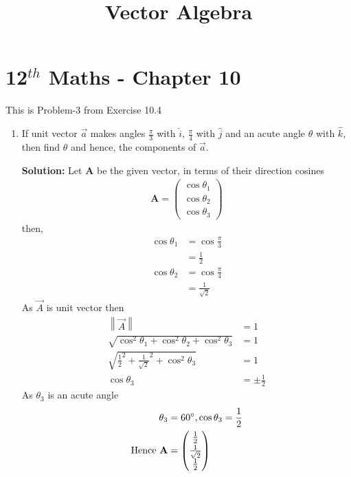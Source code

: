 \documentclass[12pt]{article}
\providecommand{\norm}[1]{\left\lVert#1\right\rVert}
\newcommand{\solution}{\noindent \textbf{Solution: }}
\newcommand{\myvec}[1]{\ensuremath{\begin{pmatrix}#1\end{pmatrix}}}
\let\vec\mathbf
\begin{document}
\begin{center}
\enlargethispage{-4cm}
\title{\textbf{Vector Algebra}}
\date{\vspace{-5ex}} %
\maketitle
\end{center}
\setcounter{page}{1}
\section*{12$^{th}$ Maths - Chapter 10}
This is Problem-3 from Exercise 10.4
\begin{enumerate}
\item If unit vector $\overrightarrow{a}$ makes angles $\frac{\pi}{3}$ with $\hat{i}$, $\frac{\pi}{4}$ with $\hat{j}$ and an acute angle $\theta$ with $\hat{k}$, then find $\theta$ and hence, the components of $\overrightarrow{a}$.

\solution
		Let $\vec{A}$ be the given vector, in terms of their direction cosines 
		\begin{align}
			\vec{A}=\myvec{\cos\theta_1\\\cos\theta_2\\\cos\theta_3}
		\end{align}
then,
		\begin{align}
			\cos\theta_1&=\cos\frac{\pi}{3}\\
			&=\frac{1}{2}\\
			\cos\theta_2&=\cos\frac{\pi}{4}\\
			&=\frac{1}{\sqrt{2}}
		\end{align}
As $\Vec{A}$ is unit vector then
\begin{align}
    \norm{\Vec{A}}&=1\\
    \sqrt{\cos^2\theta_1+\cos^2\theta_2+\cos^2\theta_3}&=1\\
    \sqrt{\frac{1}{2}^2+\frac{1}{\sqrt{2}}^2+\cos^2\theta_3 }&=1\\
    \cos\theta_3 &=\pm\frac{1}{2}
\end{align}
As $\theta_3$ is an acute angle
\begin{align}
    \theta_3&=60\degree, \cos\theta_3=\frac{1}{2}\\
    \text{Hence }\vec{A}&=\myvec{\frac{1}{2}\\[2pt] \frac{1}{\sqrt{2}}\\[2pt] \frac{1}{2}}
\end{align}
\end{enumerate}
\end{document}
